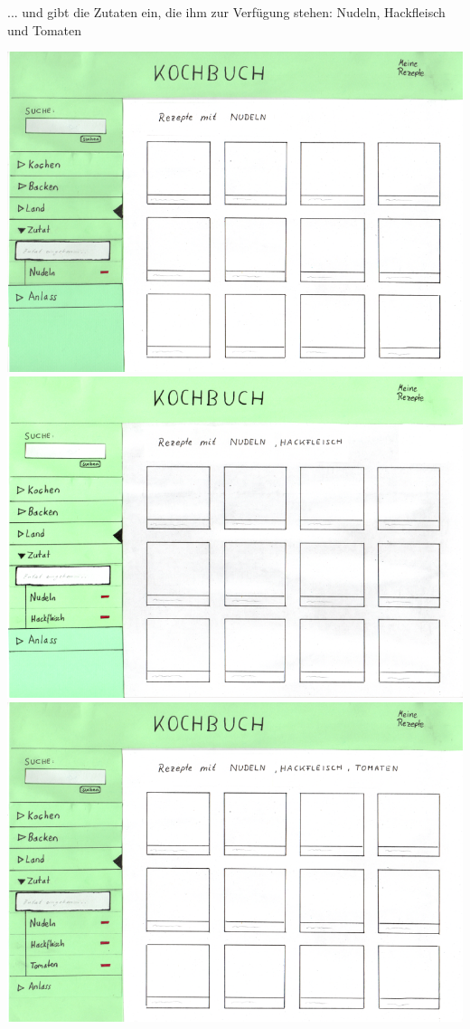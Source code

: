 \documentclass[parskip,10pt,abstracton]{scrartcl}
\begin{document}
... und gibt die Zutaten ein, die ihm zur Verfügung stehen: Nudeln, Hackfleisch und Tomaten
\begin{center}
\includegraphics[scale=0.4]{Prototyp/menu_zutat_nudeln.png}\\[1em]
\includegraphics[scale=0.4]{Prototyp/menu_zutat_nudelnhackfleisch.png}\\[1em]
\includegraphics[scale=0.4]{Prototyp/menu_zutat_nudelnhackfleischtomate.png}
\end{center}
\end{document}
